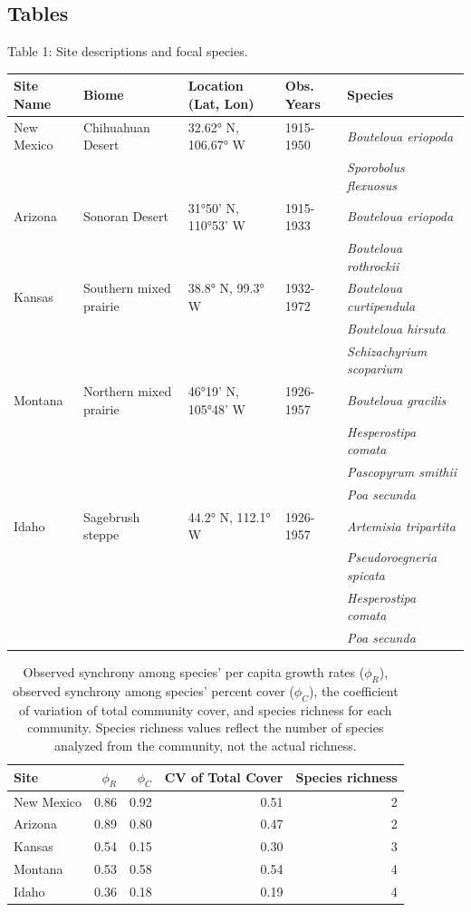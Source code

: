 \documentclass[12pt,]{article}
\begin{document}
\subsection{Tables}\label{tables}

\singlespacing

Table 1: Site descriptions and focal species. \footnotesize

\begin{longtable}[c]{@{}lllll@{}}
\toprule
Site Name & Biome & Location (Lat, Lon) & Obs. Years &
Species\tabularnewline
\midrule
\endhead
New Mexico & Chihuahuan Desert & 32.62° N, 106.67° W & 1915-1950 &
\emph{Bouteloua eriopoda}\tabularnewline
& & & & \emph{Sporobolus flexuosus}\tabularnewline
Arizona & Sonoran Desert & 31°50' N, 110°53' W & 1915-1933 &
\emph{Bouteloua eriopoda}\tabularnewline
& & & & \emph{Bouteloua rothrockii}\tabularnewline
Kansas & Southern mixed prairie & 38.8° N, 99.3° W & 1932-1972 &
\emph{Bouteloua curtipendula}\tabularnewline
& & & & \emph{Bouteloua hirsuta}\tabularnewline
& & & & \emph{Schizachyrium scoparium}\tabularnewline
Montana & Northern mixed prairie & 46°19' N, 105°48' W & 1926-1957 &
\emph{Bouteloua gracilis}\tabularnewline
& & & & \emph{Hesperostipa comata}\tabularnewline
& & & & \emph{Pascopyrum smithii}\tabularnewline
& & & & \emph{Poa secunda}\tabularnewline
Idaho & Sagebrush steppe & 44.2° N, 112.1° W & 1926-1957 &
\emph{Artemisia tripartita}\tabularnewline
& & & & \emph{Pseudoroegneria spicata}\tabularnewline
& & & & \emph{Hesperostipa comata}\tabularnewline
& & & & \emph{Poa secunda}\tabularnewline
\bottomrule
\end{longtable}

\normalsize

\pagebreak{}

\begin{table}[ht]
\centering
\caption{Observed synchrony among species' per capita growth rates ($\phi_{R}$), observed synchrony among species' percent cover ($\phi_{C}$), the coefficient of variation of total community cover, and species richness for each community. Species richness values reflect the number of species analyzed from the community, not the actual richness.} 
{\normalsize
\begin{tabular}{lrrrr}
  \hline
Site & $\phi_{R}$ & $\phi_{C}$ & CV of Total Cover & Species richness \\ 
  \hline
New Mexico & 0.86 & 0.92 & 0.51 &   2 \\ 
  Arizona & 0.89 & 0.80 & 0.47 &   2 \\ 
  Kansas & 0.54 & 0.15 & 0.30 &   3 \\ 
  Montana & 0.53 & 0.58 & 0.54 &   4 \\ 
  Idaho & 0.36 & 0.18 & 0.19 &   4 \\ 
   \hline
\end{tabular}
}
\end{table}
\end{document}
